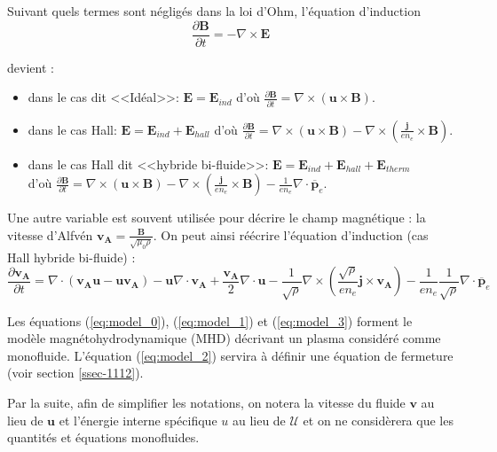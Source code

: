 Suivant quels termes sont négligés dans la loi d'Ohm, l'équation d'induction 
\begin{equation} \frac{\partial \mathbf{B}}{\partial t} = -\nabla \times \mathbf{E} \end{equation}

devient :
\begin{itemize}
 \item dans le cas dit <<Idéal>>: $\mathbf{E} =  \mathbf{E}_{ind}$ d'où $\frac{\partial \mathbf{B}}{\partial t} = \nabla \times (\mathbf{u} \times \mathbf{B}) $. 
 \item dans le cas Hall: $\mathbf{E} =  \mathbf{E}_{ind} +  \mathbf{E}_{hall}$ d'où $\frac{\partial \mathbf{B}}{\partial t} = \nabla \times (\mathbf{u} \times \mathbf{B}) - \nabla \times(\frac{\mathbf{j}}{e n_e} \times \mathbf{B})$.
  \item dans le cas Hall dit <<hybride bi-fluide>>: $\mathbf{E} =  \mathbf{E}_{ind} +  \mathbf{E}_{hall} + \mathbf{E}_{therm}$ \\ d'où $\frac{\partial \mathbf{B}}{\partial t} = \nabla \times (\mathbf{u} \times \mathbf{B}) - \nabla \times(\frac{\mathbf{j}}{e n_e} \times \mathbf{B}) - \frac{1}{e n_e} \nabla \cdot \overline{\mathbf{p}}_{e}$. 
\end{itemize}

Une autre variable est souvent utilisée pour décrire le champ magnétique : la vitesse d'Alfvén $\mathbf{v_A} = \frac{\mathbf{B}}{\sqrt{\mu_0 \rho}}$. On peut ainsi réécrire l'équation d'induction (cas Hall hybride bi-fluide) :
\begin{equation}
\frac{\partial \mathbf{v_A}}{\partial t}  =   \nabla \cdot (\mathbf{v_A}\mathbf{u} - \mathbf{u}\mathbf{v_A}) -  \mathbf{u}  \nabla \cdot \mathbf{v_A} +  \frac{\mathbf{v_A}}{2}  \nabla \cdot \mathbf{u} - \frac{1}{ \sqrt{\rho} } \nabla \times(\frac{\sqrt{\rho}}{en_e } \mathbf{j}\times \mathbf{v_A})  - \frac{1}{e n_e} \frac{1}{ \sqrt{\rho} } \nabla \cdot \overline{\mathbf{p}}_{e} \label{eq:model_3}
\end{equation}

Les équations (\ref{eq:model_0}), (\ref{eq:model_1}) et (\ref{eq:model_3}) forment le modèle magnétohydrodynamique (MHD) décrivant un plasma considéré comme monofluide. L'équation (\ref{eq:model_2}) servira à définir une équation de fermeture (voir section \ref{ssec-1112}).

Par la suite, afin de simplifier les notations, on notera la vitesse du fluide $\mathbf{v}$ au lieu de $\mathbf{u}$ et l'énergie interne spécifique $u$ au lieu de $\mathcal{U}$ et on ne considèrera que les quantités et équations monofluides. 

